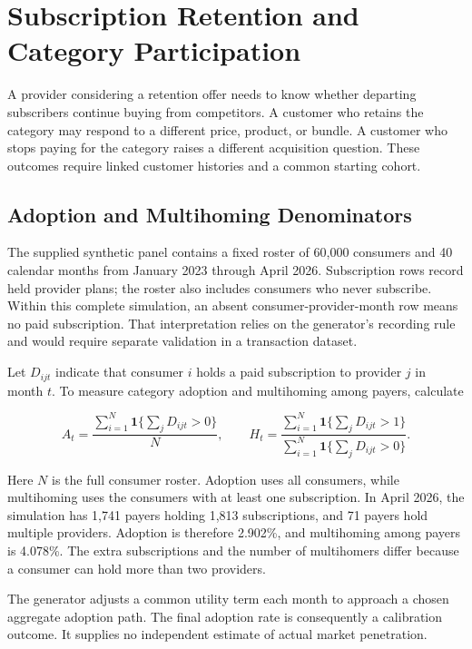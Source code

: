 \hypertarget{M04-subscription-retention-and-category-participation}{%
\section{Subscription Retention and Category
Participation}\label{M04-subscription-retention-and-category-participation}}

\noindent A provider considering a retention offer needs to know whether departing
subscribers continue buying from competitors. A customer who retains the
category may respond to a different price, product, or bundle. A
customer who stops paying for the category raises a different
acquisition question. These outcomes require linked customer histories
and a common starting cohort.

\hypertarget{M04-adoption-and-multihoming-denominators}{%
\subsection{Adoption and Multihoming
Denominators}\label{M04-adoption-and-multihoming-denominators}}

\noindent The supplied synthetic panel contains a fixed roster of 60,000 consumers
and 40 calendar months from January 2023 through April 2026.
Subscription rows record held provider plans; the roster also includes
consumers who never subscribe. Within this complete simulation, an
absent consumer-provider-month row means no paid subscription. That
interpretation relies on the generator's recording rule and would
require separate validation in a transaction dataset.

Let \(D_{ijt}\) indicate that consumer \(i\) holds a paid subscription
to provider \(j\) in month \(t\). To measure category adoption and
multihoming among payers, calculate

\[
A_t=\frac{\sum_{i=1}^{N}\mathbf{1}\{\sum_jD_{ijt}>0\}}{N},
\qquad
H_t=\frac{\sum_{i=1}^{N}\mathbf{1}\{\sum_jD_{ijt}>1\}}
{\sum_{i=1}^{N}\mathbf{1}\{\sum_jD_{ijt}>0\}}.
\]

Here \(N\) is the full consumer roster. Adoption uses all consumers,
while multihoming uses the consumers with at least one subscription. In
April 2026, the simulation has 1,741 payers holding 1,813 subscriptions,
and 71 payers hold multiple providers. Adoption is therefore 2.902\%,
and multihoming among payers is 4.078\%. The extra subscriptions and the
number of multihomers differ because a consumer can hold more than two
providers.

The generator adjusts a common utility term each month to approach a
chosen aggregate adoption path. The final adoption rate is consequently
a calibration outcome. It supplies no independent estimate of actual
market penetration.

